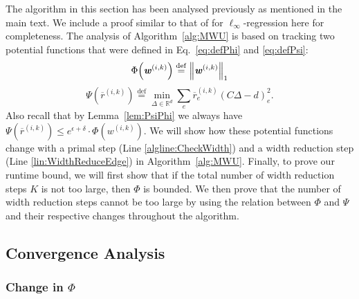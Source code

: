 \documentclass[11pt]{article}
\newcommand{\defeq}{\stackrel{\textup{def}}{=}}
\renewcommand{\norm}[1]{\ensuremath{\left\lVert #1 \right\rVert}}
\newcommand\rea{\mathbb{R}}
\let\originalleft\left
\let\originalright\right
\renewcommand{\left}{\mathopen{}\mathclose\bgroup\originalleft}
\renewcommand{\right}{\aftergroup\egroup\originalright}
\def\defeq{\stackrel{\mathrm{def}}{=}}
\newcommand\dd{\boldsymbol{\mathit{d}}}
\newcommand\ww{\boldsymbol{\mathit{w}}}
\newcommand\rrbar{\overline{\boldsymbol{\mathit{r}}}}
\newcommand\CC{\boldsymbol{\mathit{C}}}
\begin{document}
The algorithm in this section has been analysed previously as mentioned in the main text. We include a proof similar to that of \cite{adil2022fast} for $\ell_{\infty}$-regression here for completeness. The analysis of Algorithm~\ref{alg:MWU} is based on tracking two potential functions that were defined in Eq.~\eqref{eq:defPhi} and \eqref{eq:defPsi}: 
\begin{equation*}\Phi\left(\ww^{( i,k )} \right) \defeq \norm{\ww^{(i,k)}}_1
\end{equation*}
\begin{equation*}\Psi(\rrbar^{(i,k)})\defeq \min_{\Delta\in \rea^d }\sum_e \rrbar^{(i,k)}_e (\CC\Delta-\dd)^2_e.
\end{equation*}
Also recall that by Lemma~\ref{lem:PsiPhi} we always have $\Psi(\rrbar^{(i,k)}) \leq e^{\epsilon+\delta} \cdot \Phi(\ww^{(i,k)})$. 
We will show how these potential functions change with a primal step (Line \ref{algline:CheckWidth}) and a width reduction step (Line \ref{lin:WidthReduceEdge}) in Algorithm~\ref{alg:MWU}. 
Finally, to prove our runtime bound, we will first show that if the total number of width reduction steps $K$ is not too large, then $\Phi$ is bounded. We then prove that the number of width reduction steps cannot be too large by using the relation between $\Phi$ and $\Psi$ and their respective changes throughout the algorithm.


\subsection*{Convergence Analysis}

\subsubsection*{Change in $\Phi$}
\end{document}
